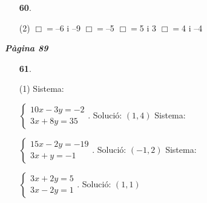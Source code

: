 \documentclass[a4paper, pdf, twoside]{book}
\begin{document}
\begin{multicols}{2}
\begin{enumerate}

 \item[\fontfamily{phv}\selectfont\color{blue}\textbf{60}. ] 
 \begin{tasks}[column-sep=1em, item-indent=1.3333em](2)
	 \task $\Box =$--6 i --9
	 \task $\Box =$--5
	 \task $\Box =$5 i 3
	 \task $\Box =$4 i --4
\end{tasks}
 \end{enumerate}
\vspace{0.3cm}


{\textbf{\em Pàgina 89}} \hrulefill
\begin{enumerate}
\vspace{0.25cm}



 \item[\fontfamily{phv}\selectfont\color{blue}\textbf{61}. ] 
 \begin{tasks}[column-sep=1em, item-indent=1.3333em](1)
	 \task* Sistema:\par $\left \{ \begin {array}{l} 10x-3y=-2\\ 3x+8y=35 \end {array} \right .$. Solució: $(1,4)$
	 \task* Sistema:\par $\left \{ \begin {array}{l} 15x-2y=-19 \\ 3x+y=-1 \end {array} \right .$. Solució: $(-1,2)$
	 \task* Sistema:\par $\left \{ \begin {array}{l} 3x+2y=5 \\ 3x-2y=1 \end {array} \right .$. Solució: $(1,1)$
\end{tasks}
 \end{enumerate}
\begin{enumerate}
\vspace{0.25cm}




\end{enumerate}
\end{multicols}
\end{document}
